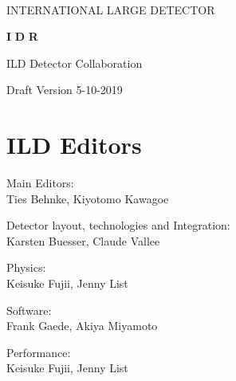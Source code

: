 %
%
\begin{titlepage}
\begin{center}
~
 ~\vskip 4cm

    {\huge  INTERNATIONAL} 
    {\huge  LARGE} 
    {\huge  DETECTOR}
    
  \vskip 1.2cm

    {\huge \bfseries I}
    {\huge \bfseries D}
    {\huge \bfseries R}

  \vskip 1.2cm




{\huge ILD Detector Collaboration} \\
    
  \vskip 0.5cm

{\huge }

  \vskip 3cm

    {\huge Draft Version 5-10-2019}

\end{center}
\end{titlepage}

\newpage\thispagestyle{empty}
\cleardoublepage


\chapter*{ILD Editors}
\noindent Main Editors:\\
Ties Behnke, Kiyotomo Kawagoe

\vspace*{2mm}

\noindent Detector layout, technologies and Integration:\\
Karsten Buesser, Claude Vallee

\vspace*{2mm}
\noindent Physics:\\
Keisuke Fujii, Jenny List

\vspace*{2mm}
\noindent Software:\\
Frank Gaede, Akiya Miyamoto

\vspace*{2mm}
\noindent Performance:\\
Keisuke Fujii, Jenny List

